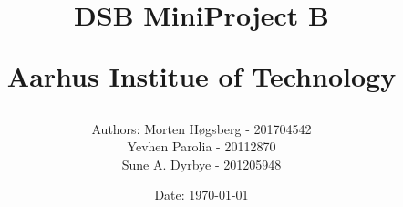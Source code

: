 \newcommand{\authorName}{}
\newcommand{\titleName}{DSB MiniProject B}
\newcommand{\subject}{}
\newcommand{\institute}{Aarhus Institue of Technology}
\begin{titlepage}
  \centering
    \title
    {
      \Huge \textbf{\titleName}\\
      \scale{\numberSQRTTWO}{\vspace{\sol pt}}
      \LARGE \textit{\subject}
      \scale{\numberSQRTTWO}{\rule{\linewidth}{\sol pt}}

      \textbf{\institute}
      \author
    {
      \LARGE Authors: Morten Høgsberg - 201704542\\ \LARGE Yevhen 					Parolia - 20112870\\
    	\LARGE Sune A. Dyrbye - 201205948\\
    }
      \date{\LARGE Date: \today}
    }
\end{titlepage}

